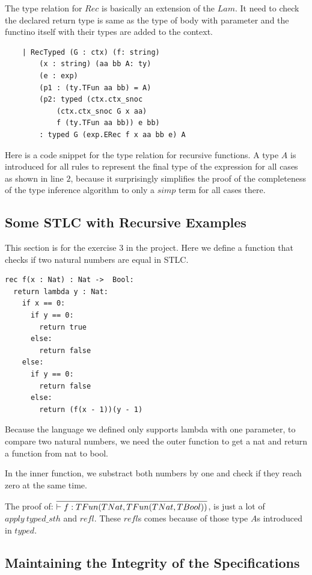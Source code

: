 \documentclass[conference]{IEEEtran}
\begin{document}
The type relation for $Rec$ is basically an extension of the $Lam$.
It need to check the declared return type is same as the type of
body with parameter and the functino itself with their types are added to the context.

\begin{lstlisting}
    | RecTyped (G : ctx) (f: string) 
        (x : string) (aa bb A: ty) 
        (e : exp) 
        (p1 : (ty.TFun aa bb) = A) 
        (p2: typed (ctx.ctx_snoc 
            (ctx.ctx_snoc G x aa) 
            f (ty.TFun aa bb)) e bb) 
        : typed G (exp.ERec f x aa bb e) A
\end{lstlisting}

Here is a code snippet for the type relation for recursive functions.
A type $A$ is introduced for all rules to represent the final type of
the expression for all cases as shown in line $2$,
because it surprisingly simplifies the
proof of the completeness of the type inference algorithm to only a $simp$
term for all cases there.

\subsection{Some STLC with Recursive Examples}
This section is for the exercise $3$ in the project.
Here we define a function that checks if two natural numbers are equal in STLC.

\begin{lstlisting}
rec f(x : Nat) : Nat ->  Bool:
  return lambda y : Nat:
    if x == 0:
      if y == 0:
        return true
      else:
        return false
    else:
      if y == 0:
        return false
      else:
        return (f(x - 1))(y - 1)
\end{lstlisting}
Because the language we defined only supports lambda with one parameter,
to compare two natural numbers, we need the outer function to get a nat
and return a function from nat to bool.

In the inner function, we substract both numbers by one and check if they
reach zero at the same time.

The proof of: $\infer{\vdash f:TFun(TNat, TFun(TNat,TBool))}{}$, is just
a lot of $apply\ typed\_sth$ and $refl$. These $refl$s comes because of
those type $A$s introduced in $typed$.

\subsection{Maintaining the Integrity of the Specifications}
\end{document}
